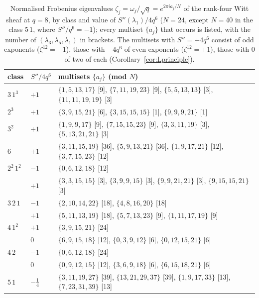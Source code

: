 \documentclass[12pt,a4paper]{amsart}
\theoremstyle{definition}
\newcommand{\Spp}{S''}
\begin{document}
\begin{table}[H]
\centering
\caption{Normalised Frobenius eigenvalues $\zeta_j=\omega_j/\sqrt q=e^{2\pi ia_j/N}$ of the rank-four Witt sheaf at $q=8$, by class and value of $\Spp(\lambda_1)/4q^6$ ($N=24$, except $N=40$ in the class $5\,1$, where $\Spp/q^6=-1$); every multiset $\{a_j\}$ that occurs is listed, with the number of $(\lambda_3,\lambda_5,\lambda_1)$ in brackets. The multisets with $\Spp=+4q^6$ consist of odd exponents ($\zeta^{12}=-1$), those with $-4q^6$ of even exponents ($\zeta^{12}=+1$), those with $0$ of two of each (Corollary~\ref{cor:Lprinciple}).}\label{tab:eigen}
\small
\begin{tabular}{@{}lll@{}}
\toprule
class & $\Spp/4q^6$ & multisets $\{a_j\}$ (mod $N$)\\
\midrule
$3\,1^3$ & $+1$ & $\{1,5,13,17\}$ [9], $\{7,11,19,23\}$ [9], $\{5,5,13,13\}$ [3], $\{11,11,19,19\}$ [3]\\
$2^3$ & $+1$ & $\{3,9,15,21\}$ [6], $\{3,15,15,15\}$ [1], $\{9,9,9,21\}$ [1]\\
$3^2$ & $+1$ & $\{1,9,9,17\}$ [9], $\{7,15,15,23\}$ [9], $\{3,3,11,19\}$ [3], $\{5,13,21,21\}$ [3]\\
$6$ & $+1$ & $\{3,11,15,19\}$ [36], $\{5,9,13,21\}$ [36], $\{1,9,17,21\}$ [12], $\{3,7,15,23\}$ [12]\\
$2^2\,1^2$ & $-1$ & $\{0,6,12,18\}$ [12]\\
 & $+1$ & $\{3,3,15,15\}$ [3], $\{3,9,9,15\}$ [3], $\{9,9,21,21\}$ [3], $\{9,15,15,21\}$ [3]\\
$3\,2\,1$ & $-1$ & $\{2,10,14,22\}$ [18], $\{4,8,16,20\}$ [18]\\
 & $+1$ & $\{5,11,13,19\}$ [18], $\{5,7,13,23\}$ [9], $\{1,11,17,19\}$ [9]\\
$4\,1^2$ & $+1$ & $\{3,9,15,21\}$ [24]\\
 & $0$ & $\{6,9,15,18\}$ [12], $\{0,3,9,12\}$ [6], $\{0,12,15,21\}$ [6]\\
$4\,2$ & $-1$ & $\{0,6,12,18\}$ [24]\\
 & $0$ & $\{0,9,12,15\}$ [12], $\{3,6,9,18\}$ [6], $\{6,15,18,21\}$ [6]\\
$5\,1$ & $-\tfrac14$ & $\{3,11,19,27\}$ [39], $\{13,21,29,37\}$ [39], $\{1,9,17,33\}$ [13], $\{7,23,31,39\}$ [13]\\
\bottomrule
\end{tabular}
\end{table}
\end{document}
